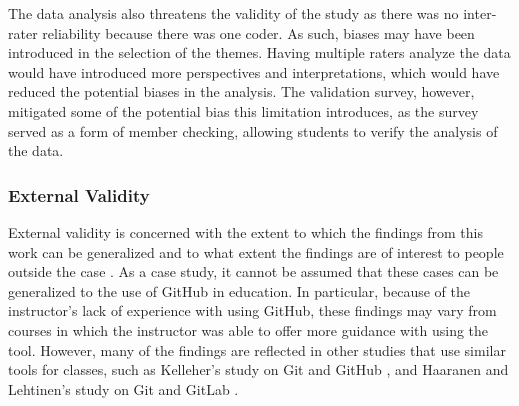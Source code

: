 The data analysis also threatens the validity of the study as there was no inter-rater reliability because there was one coder. As such, biases may have been introduced in the selection of the themes. Having multiple raters analyze the data would have introduced more perspectives and interpretations, which would have reduced the potential biases in the analysis. The validation survey, however, mitigated some of the potential bias this limitation introduces, as the survey served as a form of member checking, allowing students to verify the analysis of the data.

\subsubsection{External Validity}
 External validity is concerned with the extent to which the findings from this work can be generalized and to what extent the findings are of interest to people outside the case \cite{runeson2012case}. As a case study, it cannot be assumed that these cases can be generalized to the use of GitHub in education. In particular, because of the instructor's lack of experience with using GitHub, these findings may vary from courses in which the instructor was able to offer more guidance with using the tool. However, many of the findings are reflected in other studies that use similar tools for classes, such as Kelleher's study on Git and GitHub \cite{kelleher2014employing}, and Haaranen and Lehtinen's study on Git and GitLab \cite{haaranen2015teaching}.



